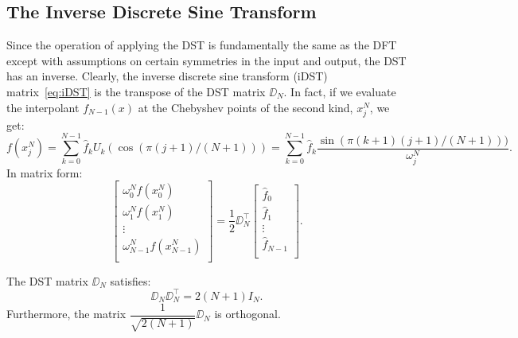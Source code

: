 \subsection{The Inverse Discrete Sine Transform}

Since the operation of applying the DST is fundamentally the same as the DFT except with assumptions on certain symmetries in the input and output, the DST has an inverse. Clearly, the inverse discrete sine transform (iDST) matrix~\eqref{eq:iDST} is the transpose of the DST matrix $\DD_N$. In fact, if we evaluate the interpolant $f_{N-1}(x)$ at the Chebyshev points of the second kind, $x_j^N$, we get:
\begin{equation}
f(x_j^N) = \sum_{k=0}^{N-1} \hat{f}_k U_k(\cos(\pi(j+1)/(N+1))) = \sum_{k=0}^{N-1} \hat{f}_k \dfrac{\sin(\pi (k+1)(j+1)/(N+1)))}{\omega_j^N}.
\end{equation}
In matrix form:
\begin{equation}\label{eq:iDST}
\begin{bmatrix} \omega_0^Nf(x_0^N)\\ \omega_1^Nf(x_1^N)\\ \vdots\\ \omega_{N-1}^Nf(x_{N-1}^N)\\\end{bmatrix}
=
\frac{1}{2}\DD_N^\top
\begin{bmatrix} \hat{f}_0\\ \hat{f}_1\\ \vdots\\ \hat{f}_{N-1}\\\end{bmatrix}.
\end{equation}

\begin{theorem}
The DST matrix $\DD_N$ satisfies:
\[
\DD_N\DD_N^\top = 2(N+1)I_N.
\]
Furthermore, the matrix $\dfrac{1}{\sqrt{2(N+1)}}\DD_N$ is orthogonal.
\end{theorem}

